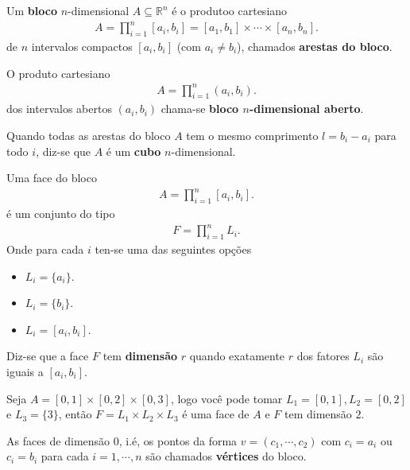\begin{definition}
  Um \textbf{bloco} $n$-dimensional $A\subseteq\mathbb{R}^{n}$ é o produtoo cartesiano
  \begin{align*}
    A=\prod_{i=1}^{n}[a_i,b_i]=[a_1,b_1]\times\cdots\times[a_n,b_n].
  \end{align*}
  de $n$ intervalos compactos $[a_i,b_i]$ (com $a_i\neq b_i$), chamados \textbf{arestas do bloco}. 
\end{definition}
\begin{definition}
  O produto cartesiano
  \begin{align*}
    A=\prod_{i=1}^{n}(a_i,b_i).
  \end{align*}
  dos intervalos abertos $(a_i,b_i)$ chama-se \textbf{bloco $n$-dimensional aberto}. 
\end{definition}
\begin{definition}[Cubo]
  Quando todas as arestas do bloco $A$ tem o mesmo comprimento $l=b_i-a_i$ para todo $i$, diz-se que $A$ é um \textbf{cubo} $n$-dimensional. 
\end{definition}
\begin{definition}[Face]
  Uma face do bloco
  \begin{align*}
    A=\prod_{i=1}^{n}[a_i,b_i].
  \end{align*}
  é um conjunto do tipo
  \begin{align*}
    F=\prod_{i=1}^{n}L_i.
  \end{align*}
  Onde para cada $i$ ten-se uma das seguintes opções
  \begin{itemize}
    \item $L_i=\{a_i\}$.
    \item $L_i=\{b_i\}$.
    \item $L_i=[a_i,b_i]$.
  \end{itemize}
  Diz-se que a face $F$ tem \textbf{dimensão} $r$ quando exatamente $r$ dos fatores $L_i$ são iguais a $[a_i,b_i]$. 
\end{definition}
\begin{example}
  Seja $A=[0,1]\times[0,2]\times[0,3]$, logo você pode tomar $L_1=[0,1], L_2=[0,2]$ e $L_3=\{3\}$, então $F=L_1\times L_2\times L_3$ é uma face de $A$ e $F$ tem dimensão $2$. 
\end{example}
\begin{definition}[Vértices]
  As faces de dimensão $0$, i.é, os pontos da forma $v=(c_1,\cdots,c_2)$ com $c_i=a_i$ ou $c_i=b_i$ para cada $i=1,\cdots,n$ são chamados \textbf{vértices} do bloco. 
\end{definition}
